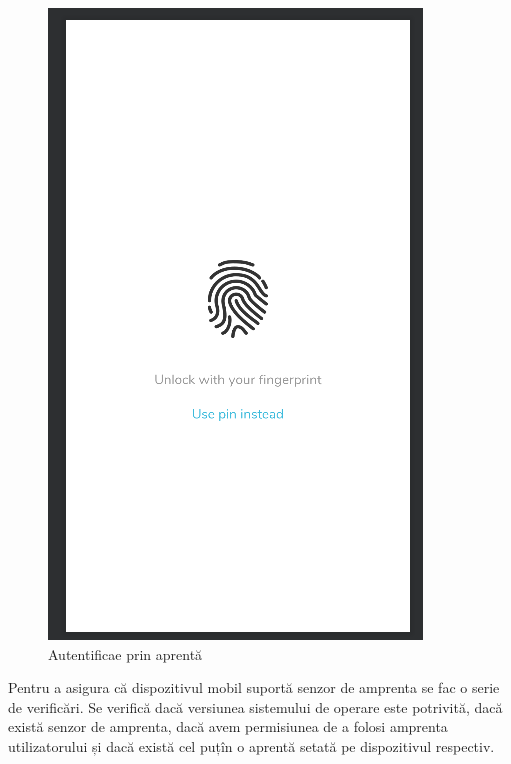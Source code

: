 \documentclass[12pt]{article}
\begin{document}
\begin{figure}[H]
\begin{minipage}[b]{0.4\textwidth}
    \includegraphics[width=\textwidth]{fingfrag.png}
    \caption{Autentificae prin aprentă}
\end{minipage}
\end{figure}

Pentru a asigura că dispozitivul mobil suportă senzor de amprenta se fac o serie 
de verificări. Se verifică dacă versiunea sistemului de operare este potrivită,
dacă există senzor de amprenta, dacă avem permisiunea de a folosi amprenta utilizatorului
și dacă există cel puțîn o aprentă setată pe dispozitivul respectiv.
\end{document}
